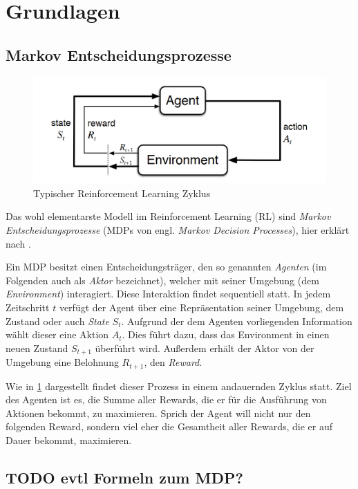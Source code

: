 \section{Grundlagen}
\label{sec:basics}

\subsection{Markov Entscheidungsprozesse}
\label{sec:reinforcement}
\begin{figure}[h]
\includegraphics[width=\textwidth, keepaspectratio=true]{images/mdp.png}
\caption{Typischer Reinforcement Learning Zyklus} \label{img:rl_cycle}
\end{figure}
Das wohl elementarste Modell im Reinforcement Learning (RL) sind \textit{Markov Entscheidungsprozesse} (MDPs von engl. \textit{Markov Decision Processes}), hier erklärt nach \cite{deeplizard_markov_decision_processes}.

Ein MDP besitzt einen Entscheidungsträger, den so genannten \textit{Agenten} (im Folgenden auch als \textit{Aktor} bezeichnet), welcher mit seiner Umgebung (dem \textit{Environment}) interagiert. Diese Interaktion findet sequentiell statt. In jedem Zeitschritt $ t $ verfügt der Agent über eine Repräsentation seiner Umgebung, dem Zustand oder auch \textit{State} $ S_t $. Aufgrund der dem Agenten vorliegenden Information wählt dieser eine Aktion $ A_t $. Dies führt dazu, dass das Environment in einen neuen Zustand $ S_{t+1} $ überführt wird. Außerdem erhält der Aktor von der Umgebung eine Belohnung $ R_{t+1} $, den \textit{Reward}.

Wie in \ref{img:rl_cycle} dargestellt findet dieser Prozess in einem andauernden Zyklus statt. Ziel des Agenten ist es, die Summe aller Rewards, die er für die Ausführung von Aktionen bekommt, zu maximieren. Sprich der Agent will nicht nur den folgenden Reward, sondern viel eher die Gesamtheit aller Rewards, die er auf Dauer bekommt, maximieren.

\subsection{TODO evtl Formeln zum MDP?}
\label{sec:markov}
